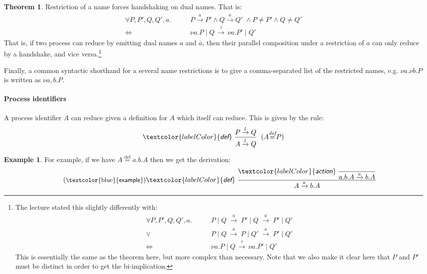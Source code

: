 \documentclass{article}
\newcommand{\defn}{\stackrel{\text{def}}{=}}
\newcommand{\exampleLabel}{\tag{\small{\textcolor{blue}{\textsf{example}}}}}
\theoremstyle{definition}
\newtheorem{example}{Example}
\newtheorem{theorem}{Theorem}
\newcommand{\dual}[1]{\overline{#1}}
\newcommand{\trule}[1]{\textcolor{labelColor}{\textit{\textsf{#1}}}\;}
\begin{document}
\begin{theorem}\label{thm:forcing-handshaking}
  Restriction of a name forces handshaking on dual names.
  That is:
    \begin{align*}
      \forall P, P', Q, Q', a . \qquad &
    P \xrightarrow{a} P' \wedge
   Q \xrightarrow{\dual{a}} Q' \; \wedge
      P \neq P' \wedge Q \neq Q' \\
    \Leftrightarrow \;\;\; &
\nu a . P \mid Q \, \xrightarrow{\tau} \, \nu a . P' \mid Q'
    \end{align*}
    That is, if two process can reduce by emitting dual names $a$ and
    $\dual{a}$, then their parallel composition under a restriction of
    $a$ can only reduce by a handshake, and vice versa.\footnote{
      The lecture stated this slightly differently with:
  \begin{align*}
    \forall P, P', Q, Q', a . \qquad &
    P \mid Q \; \xrightarrow{a} \; P' \mid Q \;
    \xrightarrow{\overline{a}} \; P' \mid Q' \\[-0.4em]
   \vee \;\;\;  & P  \mid Q \; \xrightarrow{\overline{a}} \; P \mid Q'
      \; \xrightarrow{{a}} \; P' \mid Q' \\
    \Leftrightarrow \;\;\; &
\nu a . P \mid Q \, \xrightarrow{\tau} \, \nu a . P' \mid Q'
  \end{align*}
This is essentially the same as the theorem here, but more complex
than necessary. Note that we also make it clear here that
$P$ and $P'$ must be distinct in order to get the bi-implication.}
\end{theorem}
%
Finally, a common syntactic shorthand for a several name restrictions is to
give a comma-separated list of the restricted names, e.g.
$\nu a . \nu b . P$ is written as $\nu a, b . P$.

\paragraph{Process identifiers}

A process identifier $A$ can reduce given a definition for
$A$ which itself can reduce. This is given by the rule:
%
\begin{align*}
\trule{def}
\dfrac{P \xrightarrow{l} Q}
      {A \xrightarrow{l} Q} \;\; (A {\mathrel{\mathop{=}\limits^{\textit{def}}}} P)
\end{align*}
%
\begin{example}
For example, if we have $\mathit{A} \defn{} a.b.A$ then we get
the derivation:
\begin{align*}
  \exampleLabel{}
  \trule{def}\dfrac{\trule{action}\dfrac{}{a.b.A \xrightarrow{a} b.A}}
                  {A \xrightarrow{a} b.A}
\end{align*}
\end{example}
\end{document}
